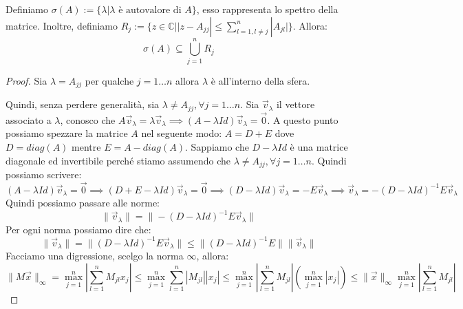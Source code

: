 \begin{teorema} 
    Definiamo $\sigma(A):=\{\lambda | \lambda\text{ è autovalore di }A\}$, esso
    rappresenta lo spettro della matrice. Inoltre, definiamo $R_j:=\{z\in \mathbb{C}|
        |z-A_{jj}| \leq \sum_{l=1, l\neq j}^{n} |A_{jl}|\}$.
    Allora:
    \begin{equation*}
        \sigma(A) \subseteq \bigcup_{j=1}^{n} R_j
    \end{equation*}
    \begin{proof}
        Sia $\lambda = A_{jj}$ per qualche $j = 1 \dots n$ allora $\lambda$ è
        all'interno della sfera.

        Quindi, senza perdere generalità, sia $\lambda \neq A_{jj}, \forall j= 1 \dots n$.
        Sia $\vec{v}_\lambda$ il vettore associato a $\lambda$, conosco che
        $A \vec{v}_\lambda = \lambda \vec{v}_\lambda \implies (A - \lambda Id)
            \vec{v}_\lambda = \vec{0}$. A questo punto possiamo spezzare la matrice 
        $A$ nel seguente modo: $A = D + E$ dove $D = diag(A)$ mentre $E = A - diag(A)$. 
        Sappiamo che $D - \lambda Id$ è una matrice diagonale ed invertibile 
        perché stiamo assumendo che $\lambda \neq A_{jj}, \forall j = 1 \dots n$.
        Quindi possiamo scrivere:
        \begin{equation*}
            (A - \lambda Id)\vec{v}_\lambda = \vec{0} \implies (D + E - \lambda 
            Id)\vec{v}_\lambda = \vec{0} \implies (D - \lambda Id)\vec{v}_\lambda 
            = - E\vec{v}_\lambda \implies \vec{v}_\lambda = -(D - \lambda Id)^{-1}
            E\vec{v}_\lambda
        \end{equation*}
        Quindi possiamo passare alle norme:
        \begin{equation*}
            \|\vec{v}_\lambda\| = \|-(D - \lambda Id)^{-1}E\vec{v}_\lambda\|
        \end{equation*}
        Per ogni norma possiamo dire che:
        \begin{equation*}
            \|\vec{v}_\lambda\| = \|(D - \lambda Id)^{-1}E\vec{v}_\lambda\| \leq
            \|(D - \lambda Id)^{-1}E\| \|\vec{v}_\lambda\|
        \end{equation*}
        Facciamo una digressione, scelgo la norma $\infty$, allora:
        \begin{equation*}
            \|M\vec{x}\|_\infty = \max_{j = 1}^n |\sum_{l = 1}^{n}M_{jl}x_j| \leq
             \max_{j = 1}^n\sum_{l = 1}^{n}|M_{jl}||x_j|\leq \max_{j = 1}^n|
             \sum_{l = 1}^{n}M_{jl}|(\max_{j = 1}^n|x_j|)\leq \|\vec{x}\|_\infty
             \max_{j = 1}^n|\sum_{l = 1}^{n}M_{jl}|
        \end{equation*}


\end{proof}
\end{teorema}
